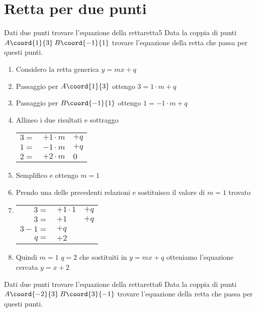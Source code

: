 \section{Retta per due punti}
\begin{esempiot}{Dati due punti trovare l'equazione della retta}{retta5}
Data la coppia di punti	$A\coord{1}{3}$\,$B\coord{-1}{1}$ trovare l'equazione della retta che passa per questi punti.
\end{esempiot}
\begin{enumerate}
	\item Considero la retta generica $y=mx+q$
	\item Passaggio per $A\coord{1}{3}$ ottengo $3=1\cdot m+q$
	\item Passaggio per $B\coord{-1}{1}$ ottengo $1=-1\cdot m+q$
	\item Allineo i due risultati e sottraggo
	\begin{tabular}{rll}
	$3=$&$+1\cdot m$ &$+q$  \\ 
	$1=$&$-1\cdot m$ &$+q$  \\ 
	\hline  $2=$&$+2\cdot m$& $0$ \\ 
	\end{tabular} 
	\item Semplifico e ottengo $m=1$
	\item Prendo una delle precedenti relazioni e sostituisco il valore di $m=1$ trovato
	\item \begin{tabular}{rll}
			$3=$&$+1\cdot 1$ &$+q$  \\ 
			$3=$&$+1$ &$+q$  \\ 
			$3-1=$& $+q$  \\ 
			$q=$&$+2$ 
		\end{tabular} 
	\item Quindi $m=1$ $q=2$ che sostituiti in $y=mx+q$ otteniamo l'equazione cercata $y=x+2$
\end{enumerate}
\begin{esempiot}{Dati due punti trovare l'equazione della retta}{retta6}
	Data la coppia di punti	$A\coord{-2}{3}$\,$B\coord{3}{-1}$ trovare l'equazione della retta che passa per questi punti.
\end{esempiot}
